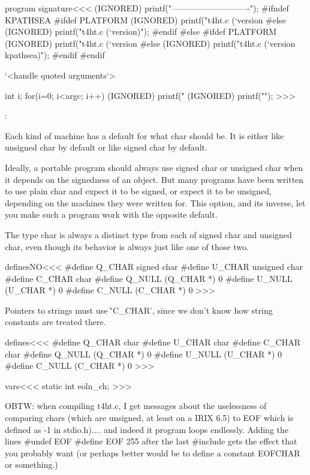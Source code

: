 \<program signature\><<<
(IGNORED) printf("----------------------------\n");
#ifndef KPATHSEA
#ifdef PLATFORM
   (IGNORED) printf("t4ht.c (`version %
#else
   (IGNORED) printf("t4ht.c (`version)\n");
#endif
#else
#ifdef PLATFORM
   (IGNORED) printf("t4ht.c (`version %
#else
   (IGNORED) printf("t4ht.c (`version kpathsea)\n");
#endif
#endif

`<handle quoted arguments`>
{ int i;  
  for(i=0; i<argc; i++){ 
    (IGNORED) printf("%
  (IGNORED) printf("\n");
}
>>>



:


 Each kind of machine has a default for what char should
          be.  It is either like unsigned char by default or like
          signed char by default.

          Ideally, a portable program should  always  use  signed
          char or unsigned char when it depends on the signedness
          of an object.  But many programs have been  written  to
          use plain char and expect it to be signed, or expect it
          to be unsigned, depending on  the  machines  they  were
          written  for.   This  option,  and its inverse, let you
          make such a program work with the opposite default.

          The type char is always a distinct type  from  each  of
          signed char and unsigned char, even though its behavior
          is always just like one of those two.




\<definesNO\><<<
#define Q_CHAR signed char
#define U_CHAR unsigned char
#define C_CHAR char
#define Q_NULL (Q_CHAR *) 0
#define U_NULL (U_CHAR *) 0
#define C_NULL (C_CHAR *) 0
>>>

Pointers to strings must use  \`'C_CHAR', since we don't 
know how string constants are treated there.


\<defines\><<<
#define Q_CHAR char
#define U_CHAR char
#define C_CHAR char
#define Q_NULL (Q_CHAR *) 0
#define U_NULL (U_CHAR *) 0
#define C_NULL (C_CHAR *) 0
>>>



\<vars\><<<
static int eoln_ch;
>>>

\Verbatim
OBTW: when compiling t4ht.c, I get messages about the uselessness of comparing
chars (which are unsigned, at least on a IRIX 6.5) to EOF which is defined as
-1 in stdio.h).... and indeed it program loops endlessly.
Adding the lines
   #undef EOF
   #define EOF 255
after the last #include gets the effect that you probably want (or perhaps
better would be to define a constant EOFCHAR or something.)
\EndVerbatim

}
